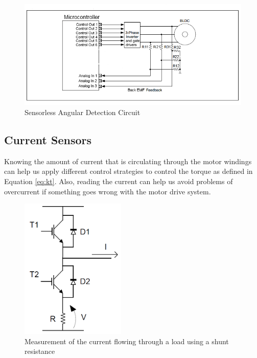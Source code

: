 \begin{figure}[htbp]
\centering
\includegraphics[width=\textwidth]{Images/sensorless_position.png} 
\caption[Sensorless Angular Detection]{Sensorless Angular Detection Circuit}
\label{fig:hall_effect}
\end{figure}

\subsection{Current Sensors}\label{subsection:current_sensors}

Knowing the amount of current that is circulating through the motor windings can help us apply different control strategies to control the torque as defined in Equation \ref{eq:kt}. Also, reading the current can help us avoid problems of overcurrent if something goes wrong with the motor drive system.

\begin{figure}[htbp]
\centering
\includegraphics[width=5cm]{Images/shunt_amp.png} 
\caption[Shunt Resistance Current Detection]{Measurement of the current flowing through a load using a shunt resistance}
\label{fig:shunt_amp}
\end{figure}

